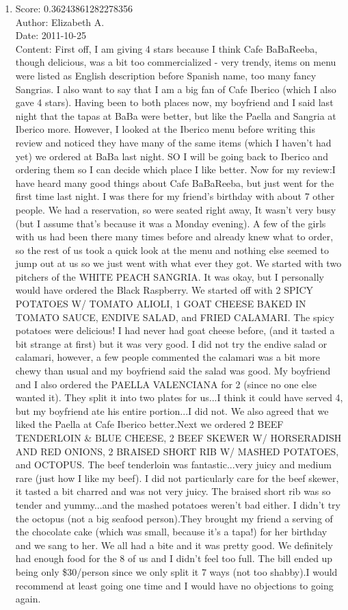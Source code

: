 \documentclass[paper=a4, fontsize=11pt]{jhwhw} %
\begin{document}
\begin{itemize}
\begin{enumerate}
            \item Score: 0.36243861282278356\\
                Author: Elizabeth A.\\
                Date: 2011-10-25\\
                Content: First off, I am giving 4 stars because I think Cafe BaBaReeba, though delicious, was a bit too commercialized - very trendy, items on menu were listed as English description before Spanish name, too many fancy Sangrias. I also want to say that I am a big fan of Cafe Iberico (which I also gave 4 stars). Having been to both places now, my boyfriend and I said last night that the tapas at BaBa were better, but like the Paella and Sangria at Iberico more. However, I looked at the Iberico menu before writing this review and noticed they have many of the same items (which I haven't had yet) we ordered at BaBa last night. SO I will be going back to Iberico and ordering them so I can decide which place I like better. Now for my review:I have heard many good things about Cafe BaBaReeba, but just went for the first time last night. I was there for my friend's birthday with about 7 other people. We had a reservation, so were seated right away, It wasn't very busy (but I assume that's because it was a Monday evening). A few of the girls with us had been there many times before and already knew what to order, so the rest of us took a quick look at the menu and nothing else seemed to jump out at us so we just went with what ever they got. We started with two pitchers of the WHITE PEACH SANGRIA. It was okay, but I personally would have ordered the Black Raspberry. We started off with 2 SPICY POTATOES W/ TOMATO ALIOLI, 1 GOAT CHEESE BAKED IN TOMATO SAUCE, ENDIVE SALAD, and FRIED CALAMARI. The spicy potatoes were delicious! I had never had goat cheese before, (and it tasted a bit strange at first) but it was very good. I did not try the endive salad or calamari, however, a few people commented the calamari was a bit more chewy than usual and my boyfriend said the salad was good. My boyfriend and I also ordered the PAELLA VALENCIANA for 2 (since no one else wanted it). They split it into two plates for us...I think it could have served 4, but my boyfriend ate his entire portion...I did not. We also agreed that we liked the Paella at Cafe Iberico better.Next we ordered 2 BEEF TENDERLOIN \& BLUE CHEESE, 2 BEEF SKEWER W/ HORSERADISH AND RED ONIONS, 2 BRAISED SHORT RIB W/ MASHED POTATOES, and OCTOPUS. The beef tenderloin was fantastic...very juicy and medium rare (just how I like my beef). I did not particularly care for the beef skewer, it tasted a bit charred and was not very juicy. The braised short rib was so tender and yummy...and the mashed potatoes weren't bad either. I didn't try the octopus (not a big seafood person).They brought my friend a serving of the chocolate cake (which was small, because it's a tapa!) for her birthday and we sang to her. We all had a bite and it was pretty good. We definitely had enough food for the 8 of us and I didn't feel too full. The bill ended up being only \$30/person since we only split it 7 ways (not too shabby).I would recommend at least going one time and I would have no objections to going again. 

\end{enumerate}
\end{itemize}
\end{document}
